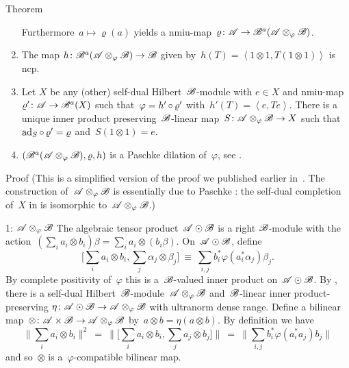 \documentclass[b]{subfiles}
\begin{document}
\begin{parsec}
\begin{point}{Theorem}
\begin{enumerate}
\begin{equation*}
            \end{equation*}
    Furthermore~$a \mapsto \varrho(a)$
        yields a
        nmiu-map~$\varrho\colon \mathscr{A} \to \mathscr{B}^a(\mathscr{A}\otimes_\varphi \mathscr{B})$.
\item
    The map
    $h\colon \mathscr{B}^a(\mathscr{A}\otimes_\varphi\mathscr{B}) \to \mathscr{B}$
    given by~$h(T) =\left<1 \otimes 1, T(1 \otimes 1)\right>$
    is ncp.
\item
Let $X$ be any (other) self-dual Hilbert~$\mathscr{B}$-module with $e \in X$ and
        nmiu-map~$\varrho'\colon \mathscr{A} \to \mathscr{B}^a(X)$
        such that~$\varphi  = h' \mathop{\circ} \varrho'$
        with~$h'(T) = \left<e,T e\right>$.
There is a unique
        inner product preserving~$\mathscr{B}$-linear
        map~$S \colon \mathscr{A}\otimes_\varphi\mathscr{B} \to X$
        such that~$\mathrm{ad}_S \mathop{\circ} \varrho' = \varrho$
        and~$S( 1\otimes 1) = e$.
\item
$(\mathscr{B}^a(\mathscr{A} \otimes_\varphi \mathscr{B}), \varrho, h)$
        is a Paschke dilation of~$\varphi$, see .
\end{enumerate}
\begin{point}{Proof}%
(This is a simplified version of the proof
    we published earlier in~\cite{wwpaschke}.
The construction of~$\mathscr{A} \otimes_\varphi \mathscr{B}$
    is essentially due to Paschke \cite[Thm.~5.2]{paschke}:
    the self-dual completion of~$X$ in \cite[Thm.~5.2]{paschke}
    is isomorphic to~$\mathscr{A} \otimes_\varphi \mathscr{B}$.)
\begin{point}{1: $\mathscr{A} \otimes_\varphi \mathscr{B}$}%
The algebraic tensor product~$\mathscr{A} \odot \mathscr{B}$
    is a right $\mathscr{B}$-module
with the action~$(\sum_i a_i \otimes b_i)\beta = \sum_i a_i \otimes(b_i\beta)$.
On~$\mathscr{A} \odot \mathscr{B}$, define
\begin{equation*}
    \bigl[\sum_i a_i \otimes b_i, \sum_j \alpha_j \otimes \beta_j\bigr]
    \ \equiv\  \sum_{i,j} b_i^* \varphi(a_i^*\alpha_j)\beta_j.
\end{equation*}
By complete positivity of~$\varphi$
this is a~$\mathscr{B}$-valued inner product on~$\mathscr{A} \odot \mathscr{B}$.
By ,
    there is a self-dual Hilbert~$\mathscr{B}$-module~$\mathscr{A}\otimes_\varphi \mathscr{B}$
    and~$\mathscr{B}$-linear inner product-preserving
    $\eta\colon \mathscr{A} \odot \mathscr{B} \to \mathscr{A} \otimes_\varphi \mathscr{B}$
    with ultranorm dense range.
Define a bilinear map~$\otimes \colon \mathscr{A} \times \mathscr{B} \to \mathscr{A} \otimes_\varphi \mathscr{B}$
    by~$a \otimes b = \eta(a \otimes b)$.
By definition we have
\begin{equation*}
\bigl\| \sum_i a_i \otimes b_i \bigr\|^2
    \ =\  \bigl\|\bigl[ \sum_i a_i\otimes b_i, \sum_j a_j \otimes b_j \bigr]\bigr\|
    \ =\  \bigl\|\sum_{i,j} b_i^* \varphi(a_i^*a_j) b_j\bigr\|
\end{equation*}
and so~$\otimes$ is a~$\varphi$-compatible bilinear map.


\end{point}
\end{point}
\end{point}
\end{parsec}
\end{document}
